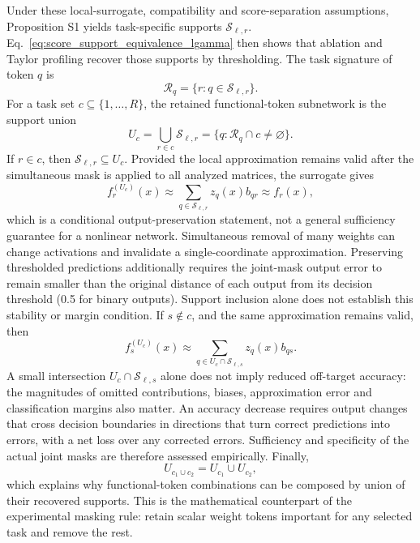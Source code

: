 \documentclass{article}
\begin{document}
Under these local-surrogate, compatibility and score-separation assumptions, Proposition S1 yields task-specific supports \(\mathcal S_{\ell,r}\). Eq.~\eqref{eq:score_support_equivalence_lgamma} then shows that ablation and Taylor profiling recover those supports by thresholding. The task signature of token \(q\) is
\begin{equation}
\mathcal R_q=\{r:q\in\mathcal S_{\ell,r}\}.
\end{equation}
For a task set \(c\subseteq\{1,\ldots,R\}\), the retained functional-token subnetwork is the support union
\begin{equation}
U_c=\bigcup_{r\in c}\mathcal S_{\ell,r}
=\{q:\mathcal R_q\cap c\ne\varnothing\}.
\end{equation}
If \(r\in c\), then \(\mathcal S_{\ell,r}\subseteq U_c\). Provided the local approximation remains valid after the simultaneous mask is applied to all analyzed matrices, the surrogate gives
\begin{equation}
f_r^{(U_c)}(x)
\approx
\sum_{q\in \mathcal S_{\ell,r}}z_q(x)b_{qr}
\approx
f_r(x),
\end{equation}
which is a conditional output-preservation statement, not a general sufficiency guarantee for a nonlinear network. Simultaneous removal of many weights can change activations and invalidate a single-coordinate approximation. Preserving thresholded predictions additionally requires the joint-mask output error to remain smaller than the original distance of each output from its decision threshold (0.5 for binary outputs). Support inclusion alone does not establish this stability or margin condition. If \(s\notin c\), and the same approximation remains valid, then
\begin{equation}
f_s^{(U_c)}(x)
\approx
\sum_{q\in U_c\cap\mathcal S_{\ell,s}}z_q(x)b_{qs}.
\end{equation}
A small intersection \(U_c\cap\mathcal S_{\ell,s}\) alone does not imply reduced off-target accuracy: the magnitudes of omitted contributions, biases, approximation error and classification margins also matter. An accuracy decrease requires output changes that cross decision boundaries in directions that turn correct predictions into errors, with a net loss over any corrected errors. Sufficiency and specificity of the actual joint masks are therefore assessed empirically. Finally,
\begin{equation}
U_{c_1\cup c_2}=U_{c_1}\cup U_{c_2},
\end{equation}
which explains why functional-token combinations can be composed by union of their recovered supports. This is the mathematical counterpart of the experimental masking rule: retain scalar weight tokens important for any selected task and remove the rest.
\end{document}
